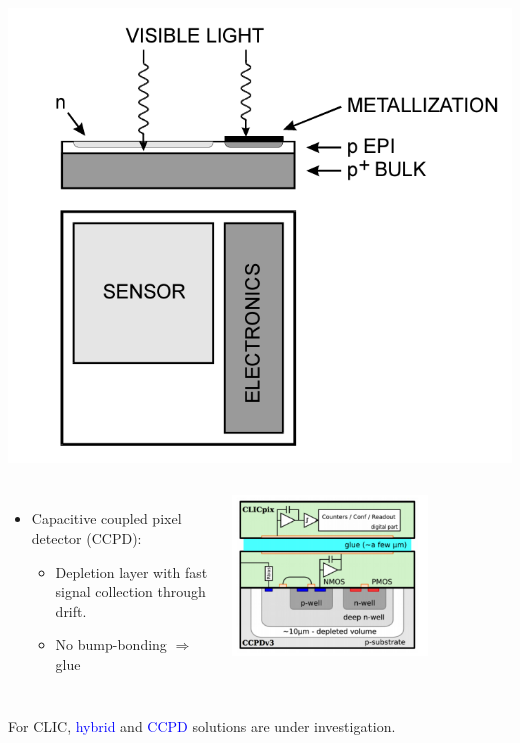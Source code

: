 \begin{frame}
\begin{columns}
    \centering
    \includegraphics[width=\textwidth]{figures/monolithic.pdf}
  \end{columns}

  \vspace{-0.1cm}
  \begin{columns}
    \begin{itemize}
    \item Capacitive coupled pixel detector (CCPD):
      \begin{itemize}
      \item Depletion layer with fast signal collection through drift.
      \item No bump-bonding $\Rightarrow$ glue
      \end{itemize}
    \end{itemize}

    \centering
    \includegraphics[width=0.7\textwidth]{figures/HVCMOS_2stageAmpl.png}
  \end{columns}

  \begin{block}{}
    \centering For CLIC, \textcolor{Blue}{hybrid} and
    \textcolor{Blue}{CCPD} solutions are under investigation.
  \end{block}


\end{frame}

